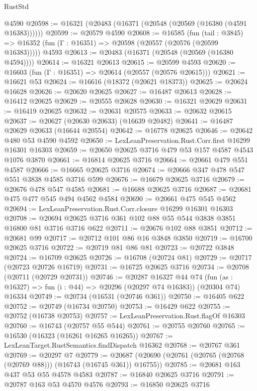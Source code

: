 \begin{lexlean}{RustStd}
\begin{coremodule}
    @4590
@20598 := @16321 (@20483 (@16371 (@20548 (@20569 (@16380 (@4591 @16383))))))
@20599 := @20579 @4590
@20608 := @16585
    (fun (tail : @3845) => @16352 (fun (Γ : @16351) => @20598 (@20557 (@20576 (@20599 @16383)))))
    @4593
@20613 := @20483 (@16371 (@20548 (@20569 (@16380 @4594))))
@20614 := @16321 @20613
@20615 := @20599 @4593
@20620 := @16603 (fun (Γ : @16351) => @20614 (@20557 (@20576 @20615)))
@20621 := @16621 @53
@20624 := @16616 (@18372 (@20621 @18373))
@20625 := @20624 @16628
@20626 := @20620 @20625
@20627 := @16487 @20613
@20628 := @16412 @20625
@20629 := @20555 @20628
@20630 := @16321 @20629
@20631 := @16419 @20625
@20632 := @20631 @20575
@20633 := @20632 @20615
@20637 := @20627 (@20630 @20633) (@16639 @20482)
@20641 := @16487 @20629 @20633 (@16644 @20554)
@20642 := @16778 @20625
@20646 := @20642 @480 @53 @4590 @4592
@20650 := LexLeanPreservation.Rust.Corr.first @16299 @16301 @16303
@20659 := @20650 @20625 @3716 @479 @53 @157 @4587 @4543 @1076 @3870
@20661 := @16814 @20625 @3716
@20664 := @20661 @479 @551 @4587
@20666 := @16665 @20625 @3716
@20674 := @20666 @347 @478 @547 @551 @3838 @4585 @3716 @599
@20676 := @16679 @20625 @3716
@20679 := @20676 @478 @547 @4585
@20681 := @16688 @20625 @3716
@20687 := @20681 @475 @477 @545 @494 @4562 @4584
@20690 := @20661 @475 @545 @4562
@20694 := LexLeanPreservation.Rust.Corr.closure @16299 @16301 @16303
@20708 := @20694 @20625 @3716 @361 @102 @88 @55 @544 @3838 @3851 @16800 @81 @3716 @3716 @622
@20711 := @20676 @102 @88 @3851
@20712 := @20681 @99
@20717 := @20712 @101 @86 @16 @3848 @3850
@20719 := @16700 @20625 @3716
@20722 := @20719 @81 @86 @81
@20723 := @20722 @3848
@20724 := @16709 @20625
@20726 := @16708 (@20724 @81)
@20729 := @20717 (@20723 @20726 @16719)
@20731 := @16725 @20625 @3716
@20734 := @20708 (@20711 (@20729 @20731))
@20746 := @20287
    @16327
    @44
    @74
    (fun (as : @16327) => fun (i : @44) => @20296 (@20297 @74 @16383))
    (@20304 @74)
    @16334
@20749 := @20734 (@16531 (@20746 @361))
@20750 := @16405 @622
@20752 := @20749 (@16734 @20750)
@20753 := @16429 @622
@20755 := @20752 (@16738 @20753)
@20757 := LexLeanPreservation.Rust.flagOf @16303
@20760 := @16743 (@20757 @55 @544)
@20761 := @20755 @20760
@20765 := @16530 (@16323 (@16261 @16265 @16265))
@20767 := LexLeanTarget.RustSemantics.findDispatch @16362
@20768 := @20767 @361
@20769 := @20297 @7
@20779 := @20687 (@20690 (@20761 (@20765 (@20768 (@20769 @88))) (@16743 (@16745 @361)) @16755))
@20785 := @20681 @163 @437 @53 @55 @4578 @4583
@20787 := @16840 @20625 @3716
@20791 := @20787 @163 @53 @4570 @4576
@20793 := @16850 @20625 @3716

\end{coremodule}
\end{lexlean}
